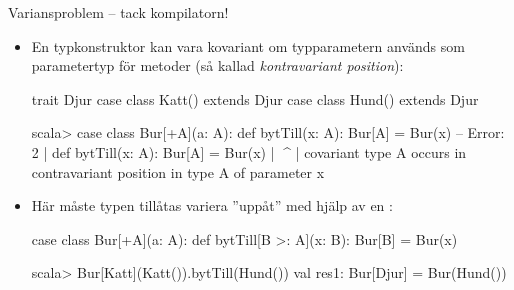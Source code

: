 \begin{Slide}{Variansproblem -- tack kompilatorn!}
\begin{itemize}\SlideFontSmall
\item En typkonstruktor kan  vara kovariant om typparametern används som parametertyp för metoder (så kallad \emph{kontravariant position}):
\begin{Code}
trait Djur
case class Katt() extends Djur
case class Hund() extends Djur
\end{Code}
\begin{REPLsmall}
scala> case class Bur[+A](a: A): 
         def bytTill(x: A): Bur[A] = Bur(x)
-- Error:
2 |  def bytTill(x: A): Bur[A] = Bur(x)
  |          ^^^^
  |  covariant type A occurs in contravariant position in type A of parameter x
\end{REPLsmall}
\item Här måste typen tillåtas variera ''uppåt'' med hjälp av en :
\begin{Code}
case class Bur[+A](a: A): 
  def bytTill[B >: A](x: B): Bur[B] = Bur(x)
\end{Code}
\begin{REPLsmall}
scala> Bur[Katt](Katt()).bytTill(Hund())
val res1: Bur[Djur] = Bur(Hund())
\end{REPLsmall}
\end{itemize}
\end{Slide}

